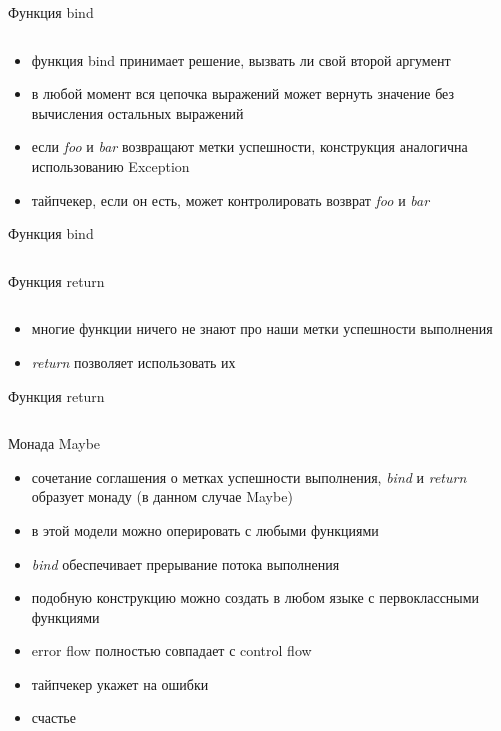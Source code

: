 \documentclass[10pt]{beamer}
\newcommand{\code}[4]{\inputminted[linenos, frame=none, firstline=#2, lastline=#3,
  framesep=10pt, bgcolor=lightgray]{#4}{#1}}
\begin{document}
\begin{frame}{Функция bind}
  \code{code.py}{69}{71}{python}
  \begin{itemize}
  \item функция bind принимает решение, вызвать ли свой второй аргумент
  \item в любой момент вся цепочка выражений может вернуть значение без вычисления остальных выражений
  \item если \emph{foo} и \emph{bar} возвращают метки успешности, конструкция аналогична использованию Exception
  \item тайпчекер, если он есть, может контролировать возврат \emph{foo} и \emph{bar}
  \end{itemize}
\end{frame}

\begin{frame}{Функция bind}
  \code{code.py}{73}{80}{python}
\end{frame}

\begin{frame}{Функция return}
  \code{code.py}{82}{83}{python}
  \begin{itemize}
  \item многие функции ничего не знают про наши метки успешности выполнения
  \item \emph{return} позволяет использовать их
  \end{itemize}
\end{frame}

\begin{frame}{Функция return}
  \code{code.py}{85}{90}{python}
\end{frame}

\begin{frame}{Монада Maybe}
  \begin{itemize}
  \item сочетание соглашения о метках успешности выполнения, \emph{bind} и \emph{return} образует монаду (в данном случае Maybe)
  \item в этой модели можно оперировать с любыми функциями
  \item \emph{bind} обеспечивает прерывание потока выполнения
  \item подобную конструкцию можно создать в любом языке с первоклассными функциями
  \item error flow полностью совпадает с control flow
  \item тайпчекер укажет на ошибки
  \item счастье
  \end{itemize}
\end{frame}
\end{document}
